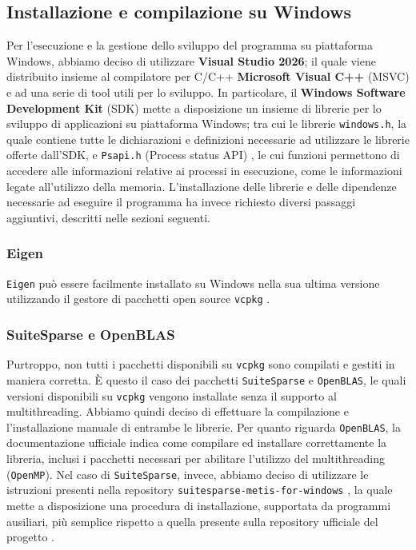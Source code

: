 \subsection{Installazione e compilazione su Windows}
Per l'esecuzione e la gestione dello sviluppo del programma su piattaforma Windows, abbiamo deciso di utilizzare
\textbf{Visual Studio 2026}; il quale viene distribuito insieme al compilatore per C/C++ \textbf{Microsoft Visual C++} (MSVC) e ad una serie di tool utili per lo sviluppo. 
In particolare, il \textbf{Windows Software Development Kit} (SDK) \cite{microsoft_windows_sdk} mette a disposizione un insieme di librerie per lo sviluppo
di applicazioni su piattaforma Windows; tra cui le librerie \texttt{windows.h}, la quale contiene tutte le dichiarazioni e definizioni necessarie
ad utilizzare le librerie offerte dall'SDK, e \texttt{Psapi.h} (Process status API) \cite{microsoft_psapi}, le cui funzioni permettono di accedere alle informazioni relative
ai processi in esecuzione, come le informazioni legate all'utilizzo della memoria.
L'installazione delle librerie e delle dipendenze necessarie ad eseguire il programma ha invece richiesto diversi passaggi aggiuntivi, descritti
nelle sezioni seguenti.
\subsubsection{Eigen}
\texttt{Eigen} può essere facilmente installato su Windows nella sua ultima versione utilizzando il gestore di pacchetti open source
\texttt{vcpkg} \cite{microsoft_vcpkg}.
\subsubsection{SuiteSparse e OpenBLAS}
Purtroppo, non tutti i pacchetti disponibili su \texttt{vcpkg} sono compilati e gestiti in maniera corretta. È questo il caso dei pacchetti
\texttt{SuiteSparse} e \texttt{OpenBLAS}, le quali versioni disponibili su \texttt{vcpkg} vengono installate senza il supporto al multithreading.
Abbiamo quindi deciso di effettuare la compilazione e l'installazione manuale di entrambe le librerie. Per quanto riguarda \texttt{OpenBLAS}, la
documentazione ufficiale \cite{openblas_installation} indica come compilare ed installare correttamente la libreria, inclusi i pacchetti necessari
per abilitare l'utilizzo del multithreading (\texttt{OpenMP}). Nel caso di \texttt{SuiteSparse}, invece, abbiamo deciso di utilizzare le istruzioni
presenti nella repository \texttt{suitesparse-metis-for-windows} \cite{suitesparse_metis_windows}, la quale mette a disposizione una procedura di installazione,
supportata da programmi ausiliari, più semplice rispetto a quella presente sulla repository ufficiale del progetto \cite{suitesparse}.
